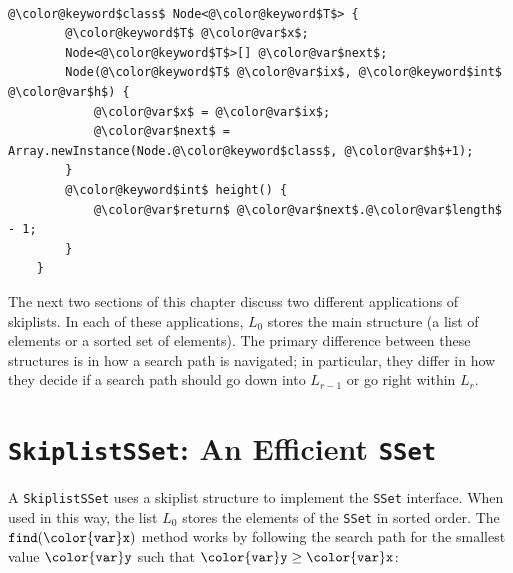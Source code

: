 \documentclass[10pt]{book}
\newcommand{\seclabel}[1]{\label{sec:#1}}
\theoremstyle{plain}
\theoremstyle{definition}
\begin{document}
 \ \vspace{.5ex}\begin{Verbatim}[gobble=1,tabsize=2,frame=single,framerule=1.2pt,commandchars=\\@\$,label=\texttt{SkiplistSSet},labelposition=topline]
	@\color@keyword$class$ Node<@\color@keyword$T$> {
		@\color@keyword$T$ @\color@var$x$;
		Node<@\color@keyword$T$>[] @\color@var$next$;
		Node(@\color@keyword$T$ @\color@var$ix$, @\color@keyword$int$ @\color@var$h$) {
			@\color@var$x$ = @\color@var$ix$;
			@\color@var$next$ = Array.newInstance(Node.@\color@keyword$class$, @\color@var$h$+1);
		}
		@\color@keyword$int$ height() {
			@\color@var$return$ @\color@var$next$.@\color@var$length$ - 1;
		}
	}
\end{Verbatim}


The next two sections of this chapter discuss two different applications
of skiplists.  In each of these applications, $L_0$ stores the main
structure (a list of elements or a sorted set of elements).
The primary difference between these structures is in how
a search path is navigated; in particular, they differ in how
they decide if a search path should go down into $L_{r-1}$ or go right
within $L_r$.

\section{\texttt{SkiplistSSet}: An Efficient \texttt{SSet}}
\seclabel{skiplistset}

%
A \texttt{SkiplistSSet} uses a skiplist structure to implement the \texttt{SSet}
interface.   When used in this way, the list $L_0$ stores the elements of
the \texttt{SSet} in sorted order.  The \ensuremath{\mathtt{find({\color{var}x})}} method works by following
the search path for the smallest value \ensuremath{\mathtt{{\color{var}y}}} such that $\ensuremath{\mathtt{{\color{var}y}}}\ge\ensuremath{\mathtt{{\color{var}x}}}$:
\end{document}
